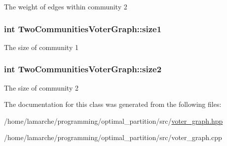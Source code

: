 The weight of edges within community 2 \hypertarget{classTwoCommunitiesVoterGraph_a3c9db0ac7e58d875ab3ce277bf74b284}{
\subsubsection[{size1}]{\setlength{\rightskip}{0pt plus 5cm}int Two\-Communities\-Voter\-Graph\-::size1}}\label{classTwoCommunitiesVoterGraph_a3c9db0ac7e58d875ab3ce277bf74b284}
The size of community 1 \hypertarget{classTwoCommunitiesVoterGraph_a8b88457f020773b984e0d8c85d9ee502}{
\subsubsection[{size2}]{\setlength{\rightskip}{0pt plus 5cm}int Two\-Communities\-Voter\-Graph\-::size2}}\label{classTwoCommunitiesVoterGraph_a8b88457f020773b984e0d8c85d9ee502}
The size of community 2 

The documentation for this class was generated from the following files\-:\begin{DoxyCompactItemize}
\item 
/home/lamarche/programming/optimal\-\_\-partition/src/\hyperlink{voter__graph_8hpp}{voter\-\_\-graph.\-hpp}\item 
/home/lamarche/programming/optimal\-\_\-partition/src/voter\-\_\-graph.\-cpp\end{DoxyCompactItemize}
